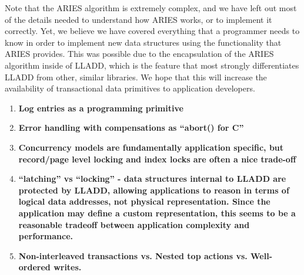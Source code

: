 \documentclass[letterpaper,english]{article}
\begin{document}
\begin{enumerate}
Note that the ARIES algorithm is extremely complex, and we have left
out most of the details needed to understand how ARIES works, or to 
implement it correctly.
Yet, we believe we have covered everything that a programmer needs
 to know in order to implement new data structures using the 
functionality that ARIES provides. This was possible due to the encapsulation
of the ARIES algorithm inside of LLADD, which is the feature that
most strongly differentiates LLADD from other, similar libraries.
We hope that this will increase the availability of transactional
data primitives to application developers.



\end{enumerate}
\begin{enumerate}

  \item {\bf Log entries as a programming primitive }


  \item {\bf Error handling with compensations as {}``abort() for C''}


  \item {\bf Concurrency models are fundamentally application specific, but
  record/page level locking and index locks are often a nice trade-off}

  \item {\bf {}``latching'' vs {}``locking'' - data structures internal to
  LLADD are protected by LLADD, allowing applications to reason in
  terms of logical data addresses, not physical representation. Since
  the application may define a custom representation, this seems to be
  a reasonable tradeoff between application complexity and
  performance.}

  \item {\bf Non-interleaved transactions vs. Nested top actions
  vs. Well-ordered writes.}

    



\end{enumerate}
\end{document}
